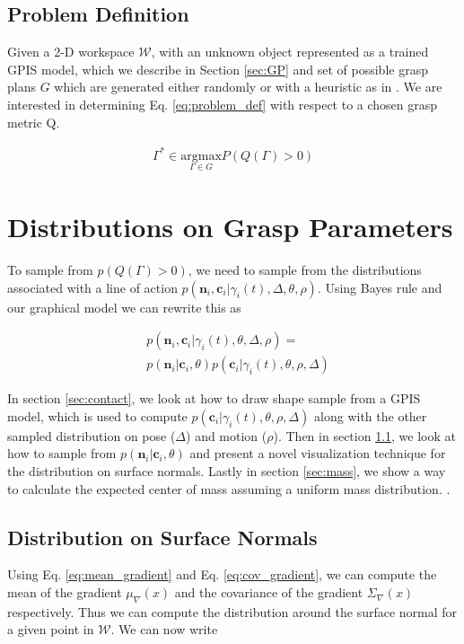 \documentclass[letterpaper, 10 pt, conference]{ieeeconf}  %
\begin{document}
\subsection{Problem Definition}

Given a 2-D workspace $\mathcal{W}$, with an unknown object represented as a trained GPIS model, which we describe in Section \ref{sec:GP} and set of possible grasp plans $G$ which are generated either randomly or with a heuristic as in \cite{mahler2015gp}.
We are interested in determining Eq. \ref{eq:problem_def} with respect to a chosen grasp metric Q. 

\vspace{-2ex}
\begin{align}\label{eq:problem_def}
\Gamma^* \in \underset{\Gamma \in G}{\mbox{argmax}} P(Q(\Gamma)>0)
\end{align}

\section{Distributions on Grasp Parameters}
\label{sec:distgrasp}
 
 To sample from $p(Q(\Gamma)>0)$, we need to sample from the distributions associated with a line of action $p(\textbf{n}_i,\textbf{c}_i|\gamma_i(t),\Delta,\theta, \rho)$. Using Bayes rule and our graphical model we can rewrite this as 
 
 \vspace{-2ex}
 \begin{align*}
 &p(\textbf{n}_i,\textbf{c}_i |\gamma_i(t),\theta,\Delta,\rho)=\\
 &p(\textbf{n}_i|\textbf{c}_i,\theta)p(\textbf{c}_i|\gamma_i(t),\theta,\rho,\Delta)
 \end{align*}
 
 In section \ref{sec:contact}, we look at how to draw shape sample from a GPIS model, which is used to compute $p(\textbf{c}_i|\gamma_i(t),\theta,\rho,\Delta)$ along with the other sampled distribution on pose ($\Delta$) and motion ($\rho$). Then in section \ref{sec:normals}, we look at how to sample from $p(\textbf{n}_i|\textbf{c}_i,\theta)$ and present a novel visualization technique for the distribution on surface normals. Lastly in section \ref{sec:mass}, we show a way to calculate the expected center of mass assuming a uniform mass distribution. 
 .
\subsection{Distribution on Surface Normals}\label{sec:normals} 
Using Eq. \ref{eq:mean_gradient} and Eq. \ref{eq:cov_gradient}, we can compute the mean of the gradient $ \mu_{\nabla}(x)$ and the covariance of the gradient $\Sigma_{\nabla}(x)$ respectively. Thus we can compute the distribution around the surface normal for a given point in $\mathcal{W}$. We can now write 
\end{document}
